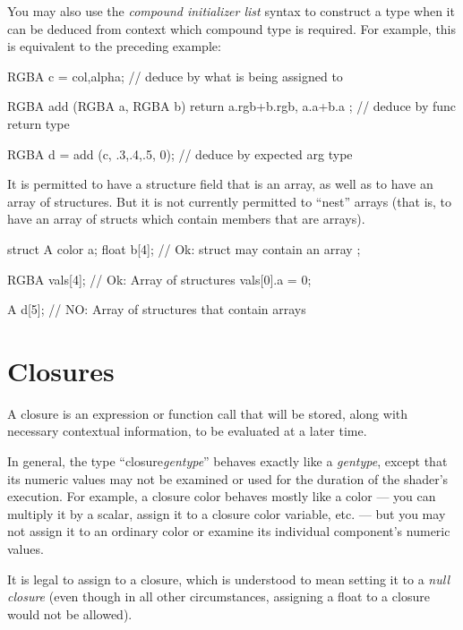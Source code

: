 \documentclass[11pt,letterpaper]{book}
\def\color{{\cf color}\xspace}
\def\closure{{\cf closure}\xspace}
\def\colorclosure{{\cf closure color}\xspace}
\begin{document}
You may also use the \emph{compound initializer list} syntax to construct a
type when it can be deduced from context which compound type is required.
For example, this is equivalent to the preceding example:

\begin{code}
    RGBA c = {col,alpha};    // deduce by what is being assigned to

    RGBA add (RGBA a, RGBA b)
    {
        return { a.rgb+b.rgb, a.a+b.a }; // deduce by func return type
    }

    RGBA d = add (c, {{.3,.4,.5}, 0}); // deduce by expected arg type
\end{code}

It is permitted to have a structure field that is an array, as well as to
have an array of structures.  But it is not currently permitted to ``nest''
arrays (that is, to have an array of structs which contain members that are
arrays).

\begin{code}
    struct A {
        color a;
        float b[4];       // Ok: struct may contain an array
    };

    RGBA vals[4];         // Ok: Array of structures
    vals[0].a = 0;

    A d[5];               // NO: Array of structures that contain arrays
\end{code}




\section{Closures}
\label{sec:types:closures}

A \closure is an expression or function call that will be stored, along
with necessary contextual information, to be evaluated at a later time.

In general, the type ``\closure \emph{gentype}'' behaves exactly like a
\emph{gentype}, except that its numeric values may not be examined or
used for the duration of the shader's execution.  For example, a
\colorclosure behaves mostly like a color --- you can multiply it by a
scalar, assign it to a \colorclosure variable, etc. --- but you may not
assign it to an ordinary \color or examine its individual component's
numeric values.

It is legal to assign {} to a closure, which is understood to mean
setting it to a \emph{null closure} (even though in all other
circumstances, assigning a {\cf float} to a \closure would not be
allowed).
\end{document}
